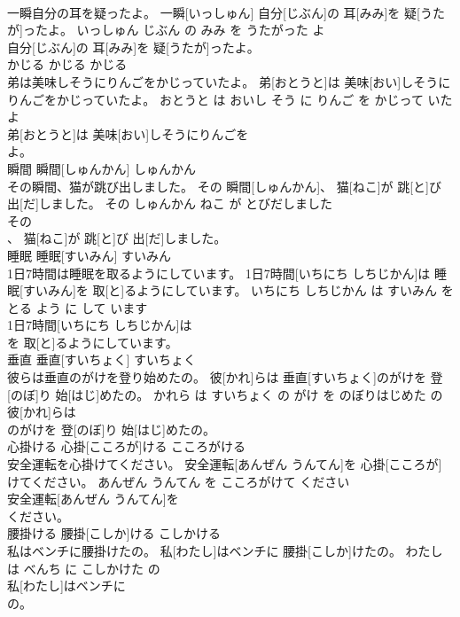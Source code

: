 \documentclass[8pt]{extreport}
\begin{document}
\begin{CJK}{UTF8}{min}
\\	一瞬自分の耳を疑ったよ。	一瞬[いっしゅん] 自分[じぶん]の 耳[みみ]を 疑[うたが]ったよ。	いっしゅん じぶん の みみ を うたがった よ	
\\	自分[じぶん]の 耳[みみ]を 疑[うたが]ったよ。			
\\	かじる	かじる	かじる	
\\	弟は美味しそうにりんごをかじっていたよ。	弟[おとうと]は 美味[おい]しそうにりんごをかじっていたよ。	おとうと は おいし そう に りんご を かじって いた よ	
\\	弟[おとうと]は 美味[おい]しそうにりんごを
\\	よ。			
\\	瞬間	瞬間[しゅんかん]	しゅんかん	
\\	その瞬間、猫が跳び出しました。	その 瞬間[しゅんかん]、 猫[ねこ]が 跳[と]び 出[だ]しました。	その しゅんかん ねこ が とびだしました	
\\	その
\\	、 猫[ねこ]が 跳[と]び 出[だ]しました。			
\\	睡眠	睡眠[すいみん]	すいみん	
\\	1日7時間は睡眠を取るようにしています。	1日7時間[いちにち しちじかん]は 睡眠[すいみん]を 取[と]るようにしています。	いちにち しちじかん は すいみん を とる よう に して います	
\\	1日7時間[いちにち しちじかん]は
\\	を 取[と]るようにしています。			
\\	垂直	垂直[すいちょく]	すいちょく	
\\	彼らは垂直のがけを登り始めたの。	彼[かれ]らは 垂直[すいちょく]のがけを 登[のぼ]り 始[はじ]めたの。	かれら は すいちょく の がけ を のぼりはじめた の	
\\	彼[かれ]らは
\\	のがけを 登[のぼ]り 始[はじ]めたの。			
\\	心掛ける	心掛[こころが]ける	こころがける	
\\	安全運転を心掛けてください。	安全運転[あんぜん うんてん]を 心掛[こころが]けてください。	あんぜん うんてん を こころがけて ください	
\\	安全運転[あんぜん うんてん]を
\\	ください。			
\\	腰掛ける	腰掛[こしか]ける	こしかける	
\\	私はベンチに腰掛けたの。	私[わたし]はベンチに 腰掛[こしか]けたの。	わたし は べんち に こしかけた の	
\\	私[わたし]はベンチに
\\	の。			

\end{CJK}
\end{document}
